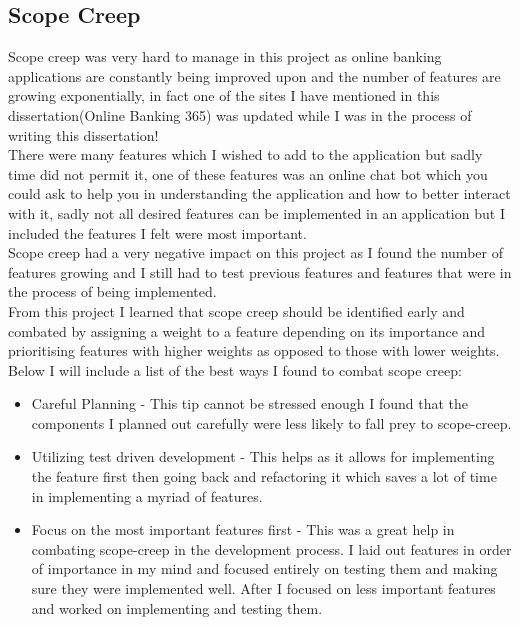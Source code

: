 \subsection{Scope Creep}
Scope creep was very hard to manage in this project as online banking applications
are constantly being improved upon and the number of features are growing exponentially, in fact
one of the sites I have mentioned in this dissertation(Online Banking 365) was updated while I was
in the process of writing this dissertation!
\\
There were many features which I wished to add to the application but sadly time did not permit it,
one of these features was an online chat bot which you could ask to help you in understanding the application
and how to better interact with it, sadly not all desired features can be implemented in an application but I included the
features I felt were most important.
\\
Scope creep had a very negative impact on this project as I found the number of features growing and I still had
to test previous features and features that were in the process of being implemented.
\\
From this project I learned that scope creep should be identified early and combated by assigning a weight to a feature depending on its importance and prioritising features with higher weights as opposed to those with lower weights.
\\
Below I will include a list of the best ways I found to combat scope creep:
\begin{itemize}
  \item Careful Planning - This tip cannot be stressed enough I found that the components I planned out carefully were less likely to fall prey to scope-creep.
  \item Utilizing test driven development - This helps as it allows for implementing the feature first then going back and refactoring it which saves a lot of time in implementing a myriad of features.
  \item Focus on the most important features first - This was a great help in combating scope-creep in the development process.  I laid out features in order of importance in my mind and focused entirely on testing them and making sure they were implemented well.  After I focused on less important features and worked on implementing and testing them.
\end{itemize}
